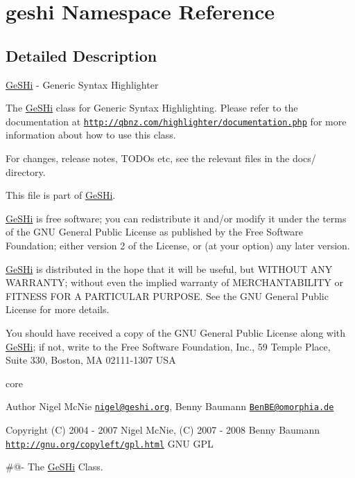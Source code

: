\hypertarget{namespacegeshi}{\section{geshi Namespace Reference}
\label{namespacegeshi}
}


\subsection{Detailed Description}
\hyperlink{class_ge_s_hi}{Ge\-S\-Hi} -\/ Generic Syntax Highlighter

The \hyperlink{class_ge_s_hi}{Ge\-S\-Hi} class for Generic Syntax Highlighting. Please refer to the documentation at \href{http://qbnz.com/highlighter/documentation.php}{\tt http\-://qbnz.\-com/highlighter/documentation.\-php} for more information about how to use this class.

For changes, release notes, T\-O\-D\-Os etc, see the relevant files in the docs/ directory.

This file is part of \hyperlink{class_ge_s_hi}{Ge\-S\-Hi}.

\hyperlink{class_ge_s_hi}{Ge\-S\-Hi} is free software; you can redistribute it and/or modify it under the terms of the G\-N\-U General Public License as published by the Free Software Foundation; either version 2 of the License, or (at your option) any later version.

\hyperlink{class_ge_s_hi}{Ge\-S\-Hi} is distributed in the hope that it will be useful, but W\-I\-T\-H\-O\-U\-T A\-N\-Y W\-A\-R\-R\-A\-N\-T\-Y; without even the implied warranty of M\-E\-R\-C\-H\-A\-N\-T\-A\-B\-I\-L\-I\-T\-Y or F\-I\-T\-N\-E\-S\-S F\-O\-R A P\-A\-R\-T\-I\-C\-U\-L\-A\-R P\-U\-R\-P\-O\-S\-E. See the G\-N\-U General Public License for more details.

You should have received a copy of the G\-N\-U General Public License along with \hyperlink{class_ge_s_hi}{Ge\-S\-Hi}; if not, write to the Free Software Foundation, Inc., 59 Temple Place, Suite 330, Boston, M\-A 02111-\/1307 U\-S\-A

core \begin{DoxyAuthor}{Author}
Nigel Mc\-Nie \href{mailto:nigel@geshi.org}{\tt nigel@geshi.\-org}, Benny Baumann \href{mailto:BenBE@omorphia.de}{\tt Ben\-B\-E@omorphia.\-de} 
\end{DoxyAuthor}
\begin{DoxyCopyright}{Copyright}
(C) 2004 -\/ 2007 Nigel Mc\-Nie, (C) 2007 -\/ 2008 Benny Baumann  \href{http://gnu.org/copyleft/gpl.html}{\tt http\-://gnu.\-org/copyleft/gpl.\-html} G\-N\-U G\-P\-L
\end{DoxyCopyright}
\#@-\/ The \hyperlink{class_ge_s_hi}{Ge\-S\-Hi} Class.

